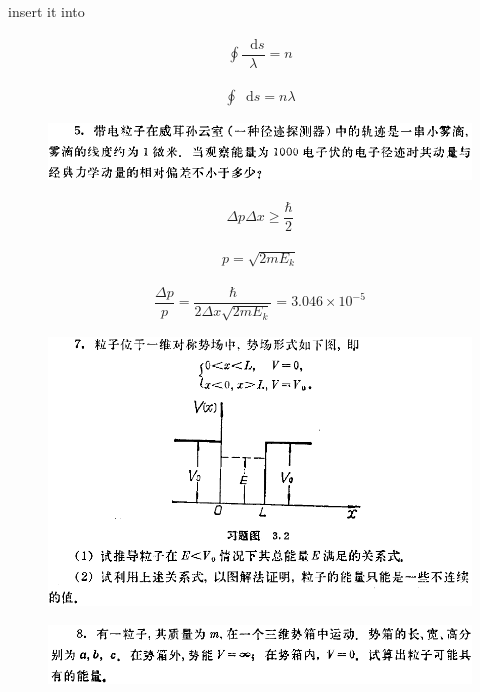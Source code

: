 \documentclass{article}
\newcommand*{\md}{\mathop{}\!\mathrm{d}}
\begin{document}
insert it into

\begin{equation*}
  \begin{aligned}
    \oint \dfrac{\md s}{\lambda}  = n
  \end{aligned}
\end{equation*}

\begin{equation*}
  \begin{aligned}
    \oint \md s = n \lambda
  \end{aligned}
\end{equation*}

\begin{figure}[H]
  \centering
  \includegraphics[width=\linewidth]{figures/5}
  \label{fig:}
\end{figure}

\begin{equation*}
  \begin{aligned}
    \Delta p \Delta x \ge \dfrac{\hbar}{2} 
  \end{aligned}
\end{equation*}

\begin{equation*}
  \begin{aligned}
    p = \sqrt{2 m E_k} 
  \end{aligned}
\end{equation*}

\begin{equation*}
  \begin{aligned}
    \dfrac{\Delta p}{p}  = \dfrac{\hbar}{2 \Delta x \sqrt{2 m E_k}} = 3.046 \times 10^{-5}
  \end{aligned}
\end{equation*}

\begin{figure}[H]
  \centering
  \includegraphics[width=\linewidth]{figures/7}
  \label{fig:}
\end{figure}
\begin{figure}[H]
  \centering
  \includegraphics[width=\linewidth]{figures/8}
  \label{fig:}
\end{figure}
\end{document}
